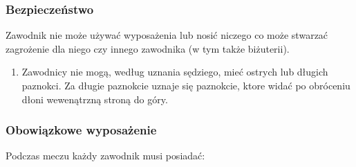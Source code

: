 \documentclass[12pt]{article}
\begin{document}
\subsubsection{Bezpieczeństwo}
Zawodnik nie może używać wyposażenia lub
nosić niczego co może stwarzać zagrożenie dla niego czy innego zawodnika
(w tym także biżuterii).

\begin{enumerate}
\item
    Zawodnicy nie mogą, według uznania sędziego, mieć ostrych lub długich
  paznokci. Za długie paznokcie uznaje się paznokcie, ktore widać po
  obróceniu dłoni wewenątrzną stroną do góry.
  \end{enumerate}

\subsubsection{Obowiązkowe wyposażenie}
Podczas meczu każdy zawodnik
musi posiadać:
\end{document}
